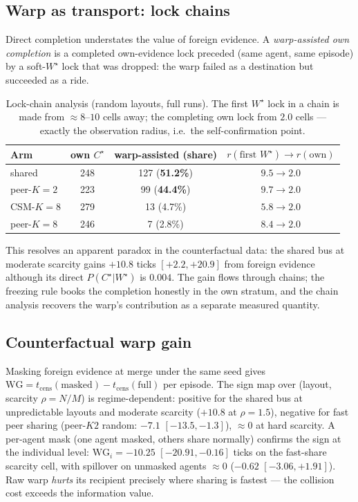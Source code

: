 \documentclass{article}
\newcommand{\wstar}{W^{\star}}
\newcommand{\cstar}{C^{\star}}
\begin{document}
\subsection{Warp as transport: lock chains}
\label{sec:taxi}

Direct completion understates the value of foreign evidence. A
\emph{warp-assisted own completion} is a completed own-evidence lock
preceded (same agent, same episode) by a soft-$\wstar$ lock that was
dropped: the warp failed as a destination but succeeded as a ride.

\begin{table}[h]
\centering
\caption{Lock-chain analysis (random layouts, full runs). The first
$\wstar$ lock in a chain is made from ${\approx}8$--$10$ cells away;
the completing own lock from $2.0$ cells --- exactly the observation
radius, i.e.\ the self-confirmation point.}
\label{tab:taxi}
\small
\begin{tabular}{lccc}
\toprule
Arm & own $\cstar$ & warp-assisted (share) & $r(\text{first }\wstar) \to r(\text{own})$ \\
\midrule
shared          & 248 & 127 (\textbf{51.2\%}) & $9.5 \to 2.0$ \\
peer-$K{=}2$    & 223 & 99 (\textbf{44.4\%})  & $9.7 \to 2.0$ \\
CSM-$K{=}8$     & 279 & 13 (4.7\%)            & $5.8 \to 2.0$ \\
peer-$K{=}8$    & 246 & 7 (2.8\%)             & $8.4 \to 2.0$ \\
\bottomrule
\end{tabular}
\end{table}

This resolves an apparent paradox in the counterfactual data: the
shared bus at moderate scarcity gains $+10.8$ ticks $[+2.2,+20.9]$
from foreign evidence although its direct $P(\cstar|\wstar)$ is
$0.004$. The gain flows through chains; the freezing rule books the
completion honestly in the own stratum, and the chain analysis
recovers the warp's contribution as a separate measured quantity.

\subsection{Counterfactual warp gain}
\label{sec:gain}

Masking foreign evidence at merge under the same seed gives
$\mathrm{WG} = t_{\text{cens}}(\text{masked}) -
t_{\text{cens}}(\text{full})$ per episode. The sign map over (layout,
scarcity $\rho{=}N/M$) is regime-dependent: positive for the shared
bus at unpredictable layouts and moderate scarcity ($+10.8$ at
$\rho{=}1.5$), negative for fast peer sharing (peer-$K2$ random:
$-7.1$ $[-13.5,-1.3]$), ${\approx}0$ at hard scarcity. A per-agent
mask (one agent masked, others share normally) confirms the sign at
the individual level: $\mathrm{WG}_i = -10.25$ $[-20.91,-0.16]$ ticks
on the fast-share scarcity cell, with spillover on unmasked agents
${\approx}0$ ($-0.62$ $[-3.06,+1.91]$). Raw warp \emph{hurts} its
recipient precisely where sharing is fastest --- the collision cost
exceeds the information value. %
\end{document}
